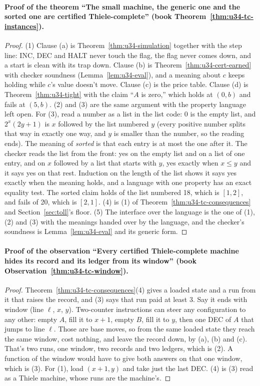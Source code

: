 \documentclass[11pt,twoside]{article}
\theoremstyle{thielethm}
\theoremstyle{thieledef}
\theoremstyle{thieledef}
\theoremstyle{thieledef}
\theoremstyle{thielethm}
\theoremstyle{thieleobs}
\theoremstyle{thielethm}
\begin{document}
\paragraph{Proof of the theorem ``The small machine, the generic one and the sorted one are certified Thiele-complete'' (book Theorem~\ref{thm:u34-tc-instances}).}
\begin{proof}
(1) Clause (a) is Theorem~\ref{thm:u34-simulation} together with the step line: INC, DEC and HALT
never touch the flag, the flag never comes down, and a start is clean with its trap down. Clause (b) is
Theorem~\ref{thm:u34-cert-earned} with checker soundness (Lemma~\ref{lem:u34-eval}), and a meaning
about $c$ keeps holding while $c$'s value doesn't move. Clause (c) is the price table. Clause (d) is
Theorem~\ref{thm:u34-tight} with the claim ``$A$ is zero,'' which holds at $(0, b)$ and fails at
$(5, b)$. (2) and (3) are the same argument with the property language left open. For (3), read
a number as a list in the list code: 0 is the empty list, and $2^x(2y + 1)$ is $x$ followed by
the list numbered $y$ (every positive number splits that way in exactly one way, and $y$ is
smaller than the number, so the reading ends). The meaning of \emph{sorted} is that each entry
is at most the one after it. The checker reads the list from the front: yes on the empty list
and on a list of one entry, and on $x$ followed by a list that starts with $y$, yes exactly when
$x \le y$ and it says yes on that rest. Induction on the length of the list shows it says yes
exactly when the meaning holds, and a language with one property has an exact equality test. The
sorted claim holds of the list numbered 18, which is $[1, 2]$, and fails of 20, which is
$[2, 1]$. (4) is (1) of Theorem~\ref{thm:u34-tc-consequences} and Section~\ref{sec:toll}'s floor.
(5) The interface over the language is the one of (1), (2) and (3) with the meanings handed over
by the language, and the checker's soundness is Lemma~\ref{lem:u34-eval} and its generic form.
\end{proof}

\paragraph{Proof of the observation ``Every certified Thiele-complete machine hides its record and its ledger from its window'' (book Observation~\ref{thm:u34-tc-window}).}
\begin{proof}
Theorem~\ref{thm:u34-tc-consequences}(4) gives a loaded state and a run from it that raises the
record, and (3) says that run paid at least 3. Say it ends with window (line $\ell$, $x$, $y$).
Two-counter instructions can steer any configuration to any other: empty $A$, fill it to $x + 1$,
empty $B$, fill it to $y$, then one DEC of $A$ that jumps to line $\ell$. Those are base moves,
so from the same loaded state they reach the same window, cost nothing, and leave the record down,
by (a), (b) and (c). That's two runs, one window, two records and two ledgers, which is (2). A function
of the window would have to give both answers on that one window, which is (3). For (1), load
$(x + 1, y)$ and take just the last DEC. (4) is (3) read as a Thiele machine,
whose runs are the machine's.
\end{proof}
\end{document}

